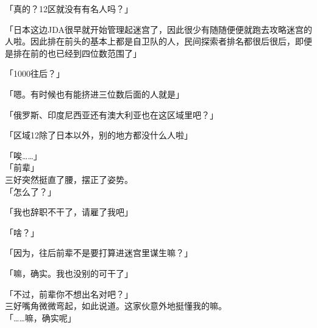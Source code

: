 「真的？12区就没有有名人吗？」

「日本这边JDA很早就开始管理起迷宫了，因此很少有随随便便就跑去攻略迷宫的人啦。因此排在前头的基本上都是自卫队的人，民间探索者排名都很后很后，即便是排在前的也已经到四位数范围了」

「1000往后？」

「嗯。有时候也有能挤进三位数后面的人就是」

「俄罗斯、印度尼西亚还有澳大利亚也在这区域里吧？」

「区域12除了日本以外，别的地方都没什么人啦」

「唉……」\\

「前辈」\\

三好突然挺直了腰，摆正了姿势。\\

「怎么了？」

「我也辞职不干了，请雇了我吧」

「啥？」

「因为，往后前辈不是要打算进迷宫里谋生嘛？」

「嘛，确实。我也没别的可干了」

「不过，前辈你不想出名对吧？」\\

三好嘴角微微弯起，如此说道。这家伙意外地挺懂我的嘛。\\

「……嘛，确实呢」

